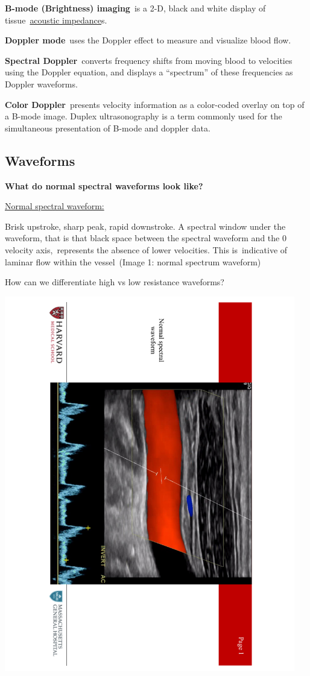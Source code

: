 \documentclass[
]{book}
\begin{document}
\textbf{B-mode (Brightness) imaging}~is a 2-D, black and white display of
tissue~\href{https://en.wikipedia.org/wiki/Acoustic_impedance}{acoustic
impedance}s.

\textbf{Doppler mode}~uses the Doppler effect to measure and visualize blood
flow.

\textbf{Spectral Doppler}~converts frequency shifts from moving blood to
velocities using the Doppler equation, and displays a ``spectrum'' of
these frequencies as Doppler waveforms.

\textbf{Color Doppler}~presents velocity information as a color-coded overlay
on top of a B-mode image. Duplex ultrasonography is a term commonly used
for the simultaneous presentation of B-mode and doppler data.

\hypertarget{waveforms}{%
\subsection{Waveforms}\label{waveforms}}

\textbf{What do normal spectral waveforms look like?}

\underline{Normal spectral waveform:}

Brisk upstroke, sharp peak, rapid downstroke. A spectral window under
the waveform, that is that black space between the spectral waveform and
the 0 velocity axis,~represents the absence of lower velocities. This
is~indicative of laminar flow within the vessel~(Image 1: normal
spectrum waveform)

How can we differentiate high vs low resistance waveforms?

\includegraphics[width=5in]{images/vasc_lab/Slide2}
\end{document}
